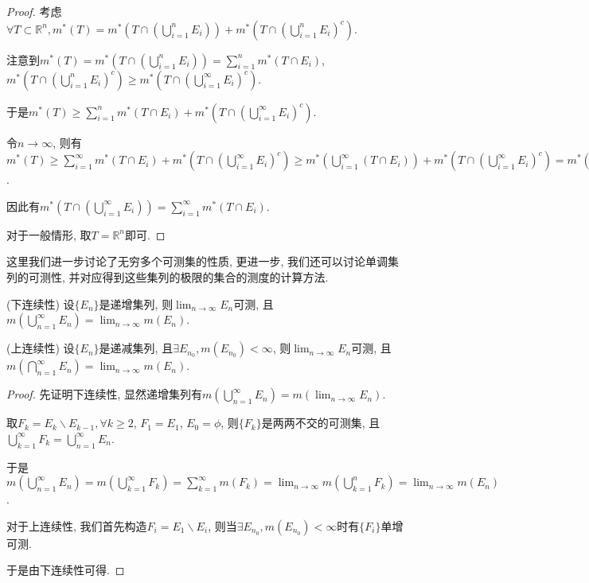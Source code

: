 \documentclass[theorem=false,mathfont=none,openany,sub3section]{easybook}
\begin{document}
\begin{proof}
  考虑$\forall T\subset \mathbb{R}^n, m^{*}(T)=m^{*}(T\cap (\bigcup_{i=1}^{n}E_i))+m^{*}(T\cap (\bigcup_{i=1}^{n}E_i)^c)$.\par
  注意到$m^{*}(T)=m^{*}(T\cap (\bigcup_{i=1}^{n}E_i))= \sum_{i=1}^{n}m^{*}(T\cap E_i)$, $m^{*}(T\cap (\bigcup_{i=1}^{n}E_i)^c)\geqslant m^{*}(T\cap (\bigcup_{i=1}^{\infty}E_i)^c)$.\par
  于是$m^{*}(T)\geqslant \sum_{i=1}^{n}m^{*}(T\cap E_i)+m^{*}(T\cap (\bigcup_{i=1}^{\infty}E_i)^c)$.\par
  令$n\to \infty$, 则有$m^{*}(T)\geqslant \sum_{i=1}^{\infty}m^{*}(T\cap E_i)+m^{*}(T\cap (\bigcup_{i=1}^{\infty}E_i)^c)\geqslant m^{*}(\bigcup_{i=1}^{\infty}(T\cap E_i))+m^{*}(T\cap (\bigcup_{i=1}^{\infty}E_i)^c) = m^{*}(T\cap (\bigcup_{i=1}^{\infty}E_i))+m^{*}(T\cap (\bigcup_{i=1}^{\infty}E_i)^c)$.\par
  因此有$m^{*}(T\cap (\bigcup_{i=1}^{\infty}E_i))=\sum_{i=1}^{\infty}m^{*}(T\cap E_i)$.\par
  对于一般情形, 取$T=\mathbb{R}^n$即可.\par
\end{proof}

这里我们进一步讨论了无穷多个可测集的性质, 更进一步, 我们还可以讨论单调集列的可测性, 并对应得到这些集列的极限的集合的测度的计算方法.\par

\begin{theorem}
  (下连续性) 设$\{E_n\}$是递增集列, 则$\lim_{n \to \infty}E_n$可测, 且$m(\bigcup_{n=1}^{\infty}E_n)=\lim_{n \to \infty}m(E_n)$.\par
  (上连续性) 设$\{E_n\}$是递减集列, 且$\exists E_{n_0}, m(E_{n_0})<\infty$, 则$\lim_{n \to \infty}E_n$可测, 且$m(\bigcap_{n=1}^{\infty}E_n)=\lim_{n \to \infty}m(E_n)$.\par
\end{theorem}

\begin{proof}
  先证明下连续性, 显然递增集列有$m(\bigcup_{n=1}^{\infty}E_n)=m(\lim_{n \to \infty}E_n)$.\par
  取$F_k=E_k \backslash E_{k-1}, \forall k \geqslant 2$, $F_1=E_1$, $E_0=\phi$, 则$\{F_k\}$是两两不交的可测集, 且$\bigcup_{k=1}^{\infty}F_k=\bigcup_{n=1}^{\infty}E_n$.\par
  于是$m(\bigcup_{n=1}^{\infty}E_n)=m(\bigcup_{k=1}^{\infty}F_k) = \sum_{k=1}^{\infty}m(F_k)=\lim_{n \to \infty} m(\bigcup_{k=1}^{n}F_k)=\lim_{n \to \infty}m(E_n)$.\par
  对于上连续性, 我们首先构造$F_{i}=E_1\backslash E_{i}$, 则当$\exists E_{n_0}, m(E_{n_0})<\infty$时有$\{F_i\}$单增可测.\par
  于是由下连续性可得.\par
\end{proof}
\end{document}
